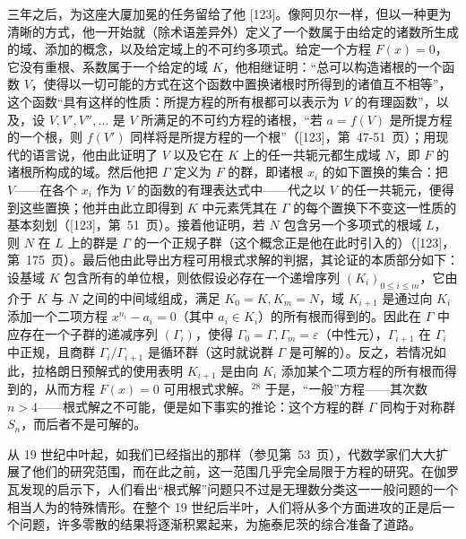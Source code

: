 三年之后，为这座大厦加冕的任务留给了他 {[}123{]}。像阿贝尔一样，但以一种更为清晰的方式，他一开始就（除术语差异外）定义了一个数属于由给定的诸数所生成的域、添加的概念，以及给定域上的不可约多项式。给定一个方程 \(F(x) = 0\)，它没有重根、系数属于一个给定的域 \(K\)，他相继证明：“总可以构造诸根的一个函数 \(V\)，使得以一切可能的方式在这个函数中置换诸根时所得到的诸值互不相等”，这个函数“具有这样的性质：所提方程的所有根都可以表示为 \(V\) 的有理函数”，以及，设 \(V, V', V'', \ldots\) 是 \(V\) 所满足的不可约方程的诸根，“若 \(a = f(V)\) 是所提方程的一个根，则 \(f(V')\) 同样将是所提方程的一个根”（{[}123{]}，第~47-51~页）；用现代的语言说，他由此证明了 \(V\) 以及它在 \(K\) 上的任一共轭元都生成域 \(N\)，即 \(F\) 的诸根所构成的域。然后他把 \(\Gamma\) 定义为 \(F\) 的群，即诸根 \(x_i\) 的如下置换的集合：把 \(V\)——在各个 \(x_i\) 作为 \(V\) 的函数的有理表达式中——代之以 \(V\) 的任一共轭元，便得到这些置换；他并由此立即得到 \(K\) 中元素凭其在 \(\Gamma\) 的每个置换下不变这一性质的基本刻划（{[}123{]}，第~51~页）。接着他证明，若 \(N\) 包含另一个多项式的根域 \(L\)，则 \(N\) 在 \(L\) 上的群是 \(\Gamma\) 的一个正规子群（这个概念正是他在此时引入的）（{[}123{]}，第~175~页）。最后他由此导出方程可用根式求解的判据，其论证的本质部分如下：设基域 \(K\) 包含所有的单位根，则依假设必存在一个递增序列 \((K_i)_{0 \leq i \leq m}\)，它由介于 \(K\) 与 \(N\) 之间的中间域组成，满足 \(K_0 = K, K_m = N\)，域 \(K_{i+1}\) 是通过向 \(K_i\) 添加一个二项方程 \(x^{n_i} - a_i = 0\)（其中 \(a_i \in K_i\)）的所有根而得到的。因此在 \(\Gamma\) 中应存在一个子群的递减序列 \((\Gamma_i)\)，使得 \(\Gamma_0 = \Gamma, \Gamma_m = \varepsilon\)（中性元），\(\Gamma_{i+1}\) 在 \(\Gamma_i\) 中正规，且商群 \(\Gamma_i / \Gamma_{i+1}\) 是循环群（这时就说群 \(\Gamma\) 是可解的）。反之，若情况如此，拉格朗日预解式的使用表明 \(K_{i+1}\) 是由向 \(K_i\) 添加某个二项方程的所有根而得到的，从而方程 \(F(x) = 0\) 可用根式求解。\(^{28}\) 于是，“一般”方程——其次数 \(n > 4\)——根式解之不可能，便是如下事实的推论：这个方程的群 \(\Gamma\) 同构于对称群 \(S_n\)，而后者不是可解的。

从 19 世纪中叶起，如我们已经指出的那样（参见第~53~页），代数学家们大大扩展了他们的研究范围，而在此之前，这一范围几乎完全局限于方程的研究。在伽罗瓦发现的启示下，人们看出“根式解”问题只不过是无理数分类这一一般问题的一个相当人为的特殊情形。在整个 19 世纪后半叶，人们将从多个方面进攻的正是后一个问题，许多零散的结果将逐渐积累起来，为施泰尼茨的综合准备了道路。

